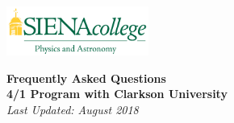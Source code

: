 \documentclass[12pt]{article}
\begin{document}
\hfill \includegraphics[width=0.35\textwidth]{siena_phys_astro_print_crop.jpg}

\vspace{0.2cm}
\begin{center}
{\LARGE {\bf Frequently Asked Questions}} \\
\medskip
{\Large {\bf 4/1 Program with Clarkson University}}  \\
\medskip
{\em Last Updated: August 2018}
\end{center}
\vspace{0.3cm}

\end{document}
